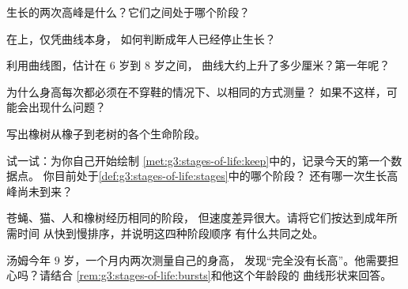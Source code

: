 \begin{exercise}[$\star$]\label{exo:g3:stages-of-life:3}
生长的两次高峰是什么？它们之间处于哪个阶段？
\end{exercise}

\begin{exercise}[$\star$]\label{exo:g3:stages-of-life:4}
在上，仅凭曲线本身，
如何判断成年人已经停止生长？
\end{exercise}

\begin{exercise}[$\star$]\label{exo:g3:stages-of-life:5}
利用曲线图，估计在 $6$ 岁到 $8$ 岁之间，
曲线大约上升了多少厘米？第一年呢？
\end{exercise}

\begin{exercise}[$\star$]\label{exo:g3:stages-of-life:6}
为什么身高每次都必须在不穿鞋的情况下、以相同的方式测量？
如果不这样，可能会出现什么问题？
\end{exercise}

\begin{exercise}[$\star$]\label{exo:g3:stages-of-life:7}
写出橡树从橡子到老树的各个生命阶段。
\end{exercise}

\begin{exercise}[$\star$]\label{exo:g3:stages-of-life:8}
试一试：为你自己开始绘制
\cref{met:g3:stages-of-life:keep}中的，记录今天的第一个数据点。
你目前处于\cref{def:g3:stages-of-life:stages}中的哪个阶段？
还有哪一次生长高峰尚未到来？
\end{exercise}

\begin{exercise}[$\star\star$]\label{exo:g3:stages-of-life:9}
苍蝇、猫、人和橡树经历相同的阶段，
但速度差异很大。请将它们按达到成年所需时间
从快到慢排序，并说明这四种阶段顺序
有什么共同之处。
\end{exercise}

\begin{exercise}[$\star\star$]\label{exo:g3:stages-of-life:10}
汤姆今年 $9$ 岁，一个月内两次测量自己的身高，
发现“完全没有长高”。他需要担心吗？请结合
\cref{rem:g3:stages-of-life:bursts}和他这个年龄段的
曲线形状来回答。
\end{exercise}
